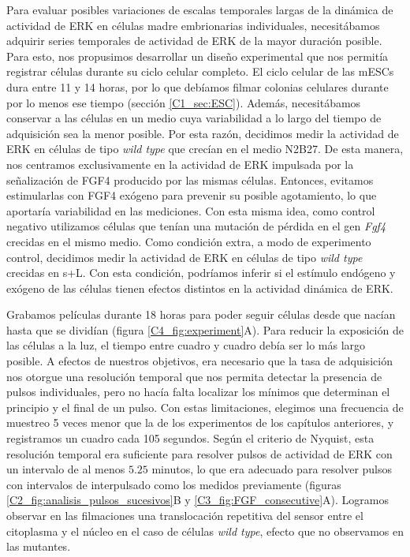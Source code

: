 \documentclass[./main.tex]{subfiles}
\begin{document}
Para evaluar posibles variaciones de escalas temporales largas de la dinámica de actividad de ERK en células madre embrionarias individuales, necesitábamos adquirir series temporales de actividad de ERK de la mayor duración posible. Para esto, nos propusimos desarrollar un diseño experimental que nos permitía registrar células durante su ciclo celular completo. El ciclo celular de las mESCs dura entre 11 y 14 horas, por lo que debíamos filmar colonias celulares durante por lo menos ese tiempo (sección \ref{C1_sec:ESC}). Además, necesitábamos conservar a las células en un medio cuya variabilidad a lo largo del tiempo de adquisición sea la menor posible. Por esta razón, decidimos medir la actividad de ERK en células de tipo \textit{wild type} que crecían en el medio N2B27. De esta manera, nos centramos exclusivamente en la actividad de ERK impulsada por la señalización de FGF4 producido por las mismas células. Entonces, evitamos estimularlas con FGF4 exógeno para prevenir su posible agotamiento, lo que aportaría variabilidad en las mediciones. Con esta misma idea, como control negativo utilizamos células que tenían una mutación de pérdida en el gen \textit{Fgf4} crecidas en el mismo medio. Como condición extra, a modo de experimento control, decidimos medir la actividad de ERK en células de tipo \textit{wild type} crecidas en s+L. Con esta condición, podríamos inferir si el estímulo endógeno y exógeno de las células tienen efectos distintos en la actividad dinámica de ERK.

Grabamos películas durante 18 horas para poder seguir células desde que nacían hasta que se dividían (figura \ref{C4_fig:experiment}A). Para reducir la exposición de las células a la luz, el tiempo entre cuadro y cuadro debía ser lo más largo posible. A efectos de nuestros objetivos, era necesario que la tasa de adquisición nos otorgue una resolución temporal que nos permita detectar la presencia de pulsos individuales, pero no hacía falta localizar los mínimos que determinan el principio y el final de un pulso. Con estas limitaciones, elegimos una frecuencia de muestreo 5 veces menor que la de los experimentos de los capítulos anteriores, y registramos un cuadro cada 105 segundos. Según el criterio de Nyquist, esta resolución temporal era suficiente para resolver pulsos de actividad de ERK con un intervalo de al menos $5.25$ minutos, lo que era adecuado para resolver pulsos con intervalos de interpulsado como los medidos previamente (figuras \ref{C2_fig:analisis_pulsos_sucesivos}B y \ref{C3_fig:FGF_consecutive}A). Logramos observar en las filmaciones una translocación repetitiva del sensor entre el citoplasma y el núcleo en el caso de células \textit{wild type}, efecto que no observamos en las mutantes.
\end{document}
